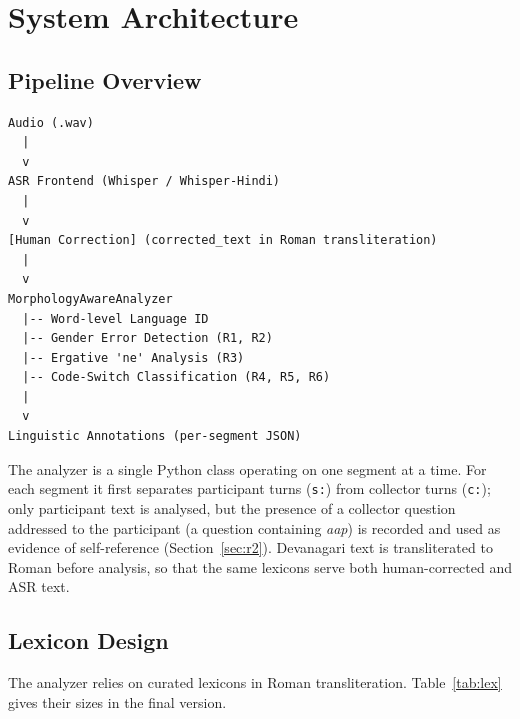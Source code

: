 \documentclass[11pt,a4paper]{report}
\begin{document}
\chapter{System Architecture}
\label{sec:system}

\section{Pipeline Overview}

\begin{verbatim}
Audio (.wav)
  |
  v
ASR Frontend (Whisper / Whisper-Hindi)
  |
  v
[Human Correction] (corrected_text in Roman transliteration)
  |
  v
MorphologyAwareAnalyzer
  |-- Word-level Language ID
  |-- Gender Error Detection (R1, R2)
  |-- Ergative 'ne' Analysis (R3)
  |-- Code-Switch Classification (R4, R5, R6)
  |
  v
Linguistic Annotations (per-segment JSON)
\end{verbatim}

The analyzer is a single Python class operating on one segment at a time. For each segment it first separates participant turns (\texttt{s:}) from collector turns (\texttt{c:}); only participant text is analysed, but the presence of a collector question addressed to the participant (a question containing \textit{aap}) is recorded and used as evidence of self-reference (Section~\ref{sec:r2}). Devanagari text is transliterated to Roman before analysis, so that the same lexicons serve both human-corrected and ASR text.

\section{Lexicon Design}

The analyzer relies on curated lexicons in Roman transliteration. Table~\ref{tab:lex} gives their sizes in the final version.
\end{document}
